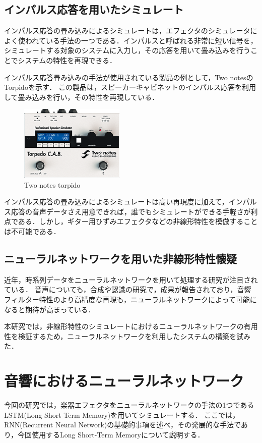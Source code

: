 \documentclass{jreport}		%
\begin{document}
\section{インパルス応答を用いたシミュレート}
インパルス応答の畳み込みによるシミュレートは，エフェクタのシミュレータによく使われている手法の一つである．インパルスと呼ばれる非常に短い信号を，シミュレートする対象のシステムに入力し，その応答を用いて畳み込みを行うことでシステムの特性を再現できる．

インパルス応答畳み込みの手法が使用されている製品の例として，Two notesのTorpidoを示す．\cite{torpido}
この製品は，スピーカーキャビネットのインパルス応答を利用して畳み込みを行い，その特性を再現している．

\begin{figure}[htbp]
 \begin{center}
  \includegraphics[width=50mm]{torpido.png}
 \end{center}
 \caption{Two notes torpido}
 \label{fig:one}
\end{figure}

インパルス応答の畳み込みによるシミュレートは高い再現度に加えて，インパルス応答の音声データさえ用意できれば，誰でもシミュレートができる手軽さが利点である．しかし，ギター用ひずみエフェクタなどの非線形特性を模倣することは不可能である．

\section{ニューラルネットワークを用いた非線形特性懐疑}
近年，時系列データをニューラルネットワークを用いて処理する研究が注目されている．
音声についても，合成や認識の研究で，成果が報告されており\cite{ninsiki}\cite{gousei}，音響フィルター特性のより高精度な再現も，ニューラルネットワークによって可能になると期待が高まっている．

本研究では，非線形特性のシミュレートにおけるニューラルネットワークの有用性を検証するため，ニューラルネットワークを利用したシステムの構築を試みた．

\chapter{音響におけるニューラルネットワーク}
今回の研究では，楽器エフェクタをニューラルネットワークの手法の1つであるLSTM(Long Short-Term Memory)を用いてシミュレートする．
ここでは，RNN(Recurrent Neural Network)の基礎的事項を述べ，その発展的な手法であり，今回使用するLong Short-Term Memoryについて説明する．
\end{document}
